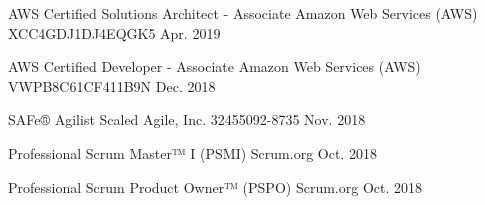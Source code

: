 \begin{cvhonors}
\cvhonor
  {AWS Certified Solutions Architect - Associate} %
  {Amazon Web Services (AWS)} %
  {XCC4GDJ1DJ4EQGK5} %
  {Apr. 2019} %

\cvhonor
  {AWS Certified Developer - Associate} %
  {Amazon Web Services (AWS)} %
  {VWPB8C61CF411B9N} %
  {Dec. 2018} %

\cvhonor
  {SAFe® Agilist} %
  {Scaled Agile, Inc.} %
  {32455092-8735} %
  {Nov. 2018} %

\cvhonor
  {Professional Scrum Master™ I (PSMI)} %
  {Scrum.org} %
  {} %
  {Oct. 2018} %

\cvhonor
  {Professional Scrum Product Owner™ (PSPO)} %
  {Scrum.org} %
  {} %
  {Oct. 2018} %

\end{cvhonors}

